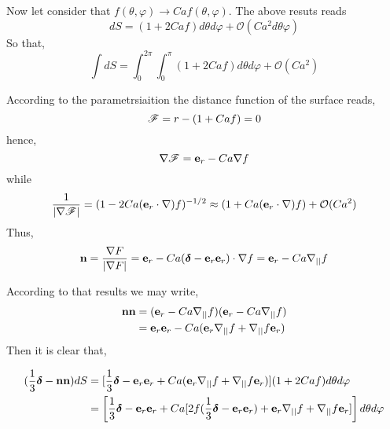 Now let consider  that $f(\theta , \varphi)\to Ca f(\theta , \varphi)$.
The above resuts reads 
\begin{equation}
    dS 
    =
    (1+2Ca f) 
    d\theta d\varphi
    + \mathcal{O}(Ca^2d\theta\varphi)
\end{equation}
So that, 
\begin{equation}
    \int dS 
    =
    \int_0^{2\pi}
    \int_0^{\pi}
    (1+2Ca f) 
    d\theta d\varphi
    + \mathcal{O}(Ca^2)
\end{equation}


According to the parametrsiaition the distance function of the surface reads,
\begin{equation}
    \mathscr{F} = r - (1+Ca f) = 0
\end{equation}
hence, 
\begin{equation}
    \mathbf{\nabla} \mathscr{F} = \textbf{e}_r - Ca \mathbf{\nabla} f
\end{equation}
while
\begin{equation}
    \frac{1}{|\mathbf{\nabla} \mathscr{F}|} = (1 - 2 Ca  (\textbf{e}_r \cdot \mathbf{\nabla}) f)^{-1/2}
    \approx (1+ Ca (\textbf{e}_r \cdot \mathbf{\nabla}) f) +\mathcal{O}(Ca^2)
\end{equation}
Thus,
\begin{equation}
    \textbf{n} 
    =
    \frac{\mathbf{\nabla} F}{|\mathbf{\nabla} F|}
    =
    \textbf{e}_r - Ca (\bm\delta - \textbf{e}_r \textbf{e}_r) \cdot \mathbf{\nabla} f
    =
    \textbf{e}_r - Ca \mathbf{\nabla}_{||} f
\end{equation}

According to that results we may write, 
\begin{align*}
    \textbf{nn} 
    &=
    (\textbf{e}_r - Ca \mathbf{\nabla}_{||} f)
    (\textbf{e}_r - Ca \mathbf{\nabla}_{||} f)\\
    &=
    \textbf{e}_r \textbf{e}_r
    - Ca (\textbf{e}_r \mathbf{\nabla}_{||} f + \mathbf{\nabla}_{||} f \textbf{e}_r )
\end{align*}
Then it is clear that, 

\begin{align}
    (\frac{1}{3}\bm\delta - \textbf{nn}) dS
    &=
    [
    \frac{1}{3}\bm\delta
    - \textbf{e}_r \textbf{e}_r
    + Ca (\textbf{e}_r \mathbf{\nabla}_{||} f + \mathbf{\nabla}_{||} f \textbf{e}_r )
    ]
    (1 + 2 Ca f) d\theta d\varphi
    \\
    &=
    \left[
    \frac{1}{3}\bm\delta   
    - \textbf{e}_r \textbf{e}_r 
    + Ca [
        2f(\frac{1}{3}\bm\delta 
        - \textbf{e}_r \textbf{e}_r )
        + \textbf{e}_r \mathbf{\nabla}_{||} f 
        + \mathbf{\nabla}_{||} f \textbf{e}_r 
        ]
    \right]d\theta d\varphi
    \\
\end{align}


